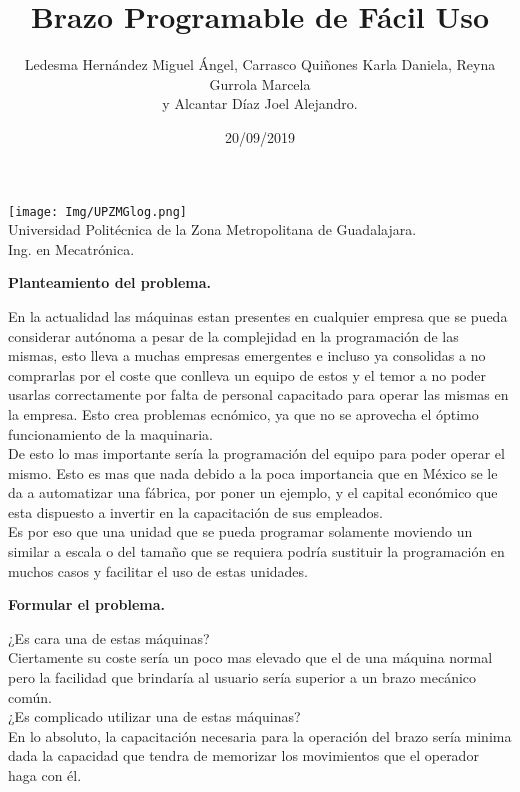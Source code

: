 \documentclass[letterpaper]{article}
\title{\textbf{Brazo Programable de Fácil Uso }}
\author{Ledesma Hernández Miguel Ángel, Carrasco Quiñones Karla Daniela, Reyna Gurrola Marcela\\ y Alcantar Díaz Joel Alejandro.}
\date{20/09/2019}
\begin{document}
\maketitle
\begin{center}
    \texttt{[image: Img/UPZMGlog.png]}\\
    \vspace{1cm}
    Universidad Politécnica de la Zona Metropolitana de Guadalajara.\\
    \vspace{1cm}
Ing. en Mecatrónica.
\end{center}\newpage
\begin{large}
    \begin{LARGE}
        \textbf{Planteamiento del problema.}\\
    \end{LARGE}%
    \begin{large}
    En la actualidad las máquinas estan presentes en cualquier empresa que se pueda considerar autónoma a pesar de la complejidad en la programación de las mismas, esto lleva a muchas empresas emergentes e incluso ya consolidas a no comprarlas por el coste que conlleva un equipo de estos y el temor a no poder usarlas correctamente por falta de personal capacitado para operar las mismas en la empresa. Esto crea problemas ecnómico, ya que no se aprovecha el óptimo funcionamiento de la maquinaria.\\
    De esto lo mas importante sería la programación del equipo para poder operar el mismo. Esto es mas que nada debido a la poca importancia que en México se le da a automatizar una fábrica, por poner un ejemplo, y el capital económico que esta dispuesto a invertir en la capacitación de sus empleados.\\
    Es por eso que una unidad que se pueda programar solamente moviendo un similar a escala o del tamaño que se requiera podría sustituir la programación en muchos casos y facilitar el uso de estas unidades.\\
    \end{large}
\end{large}

\begin{large}
    \begin{LARGE}
       \textbf{Formular el problema.}\\
    \end{LARGE}
    
    ¿Es cara una de estas máquinas?\\
    Ciertamente su coste sería un poco mas elevado que el de una máquina normal pero la facilidad que brindaría al usuario sería superior a un brazo mecánico común.\\

    ¿Es complicado utilizar una de estas máquinas?\\
    En lo absoluto, la capacitación necesaria para la operación del brazo sería minima dada la capacidad que tendra de memorizar los movimientos que el operador haga con él.\\
    
    
\end{large}
\end{document}
